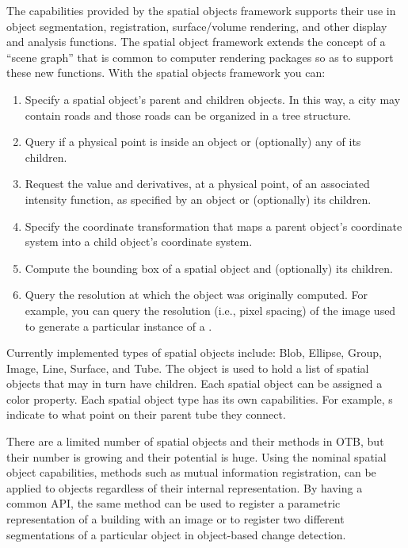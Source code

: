 The capabilities provided by the spatial objects framework supports their use
in object segmentation, registration, surface/volume rendering, and other
display and analysis functions. The spatial object framework extends the
concept of a ``scene graph''  that is common to computer rendering packages so
as to support these new functions. With the spatial objects framework you
can:
\begin{enumerate}

        \item Specify a spatial object's parent and children objects.  In
        this way, a city may contain roads and those roads can be
        organized in a tree structure.

        \item Query if a physical point is inside an object or
        (optionally) any of its children.

        \item Request the value and derivatives, at a physical point,
        of an associated intensity function, as specified
        by an object or (optionally) its children.

        \item Specify the coordinate transformation that maps a parent
        object's coordinate system into a child object's coordinate system.

        \item Compute the bounding box of a spatial object and (optionally)
        its children.

        \item Query the resolution at which the object was originally
        computed.  For example, you can query the resolution (i.e., pixel
        spacing) of the image used to generate a particular instance of a
        .
\end{enumerate}

Currently implemented types of spatial objects include: Blob, Ellipse,
Group, Image, Line, Surface, and Tube.  The 
object is used to hold a list of spatial objects that may in turn have
children.  Each spatial object can be assigned a color property.  Each
spatial object type has its own capabilities. For example,
s indicate to what point on their parent
tube they connect.

There are a limited number of spatial objects and their methods in OTB, but
their number is growing and their potential is huge. Using the nominal
spatial object capabilities, methods such as mutual
information registration, can be applied to objects regardless of their
internal representation. By having a common API, the same method can be used
to register a parametric representation of a building with an image or
to register two different segmentations of a particular object in
object-based change detection.

